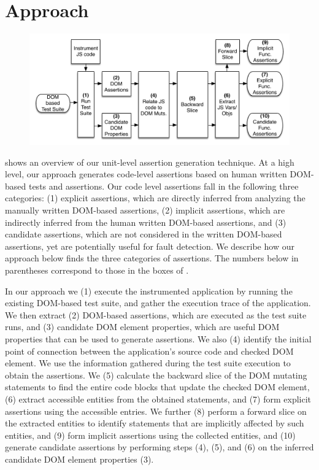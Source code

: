 \section{Approach} \label{Sec:approach}
\begin{figure}[!t]
  \centering
  \includegraphics[width=1\hsize]{fig/approachDiagram}
  \vspace{-0.3in} 
  \label{Fig:approachDiagram}
  \vspace{-0.2in} 
\end{figure}

 shows an overview of our unit-level assertion generation technique.
At a high level, our approach generates code-level assertions based on human written DOM-based tests and assertions. Our code level assertions fall in the following three categories: (1) explicit assertions, which are directly inferred from analyzing the manually written DOM-based assertions, (2) implicit assertions, which are indirectly inferred from the human written DOM-based assertions, and (3) candidate assertions, which are not considered in the written DOM-based assertions, yet are potentially useful for fault detection. We describe how our approach below finds the three categories of assertions. The numbers below in parentheses correspond to those in the boxes of .

In our approach we (1) execute the instrumented application by running the existing DOM-based test suite, and gather the execution trace of the application. We then extract (2) DOM-based assertions, which are executed as the test suite runs, and (3) candidate DOM element properties, which are useful DOM properties that can be used to generate assertions. We also (4) identify the initial point of connection between the application's source code and checked DOM element.
We use the information gathered during the test suite execution to obtain the assertions. We (5) calculate the backward slice of the DOM mutating statements to find the entire code blocks that update the checked DOM element, (6) extract accessible entities from the obtained statements, and (7) form explicit assertions using the accessible entries. 
We further (8) perform a forward slice on the extracted entities to identify statements that are implicitly affected by such entities, and (9) form implicit assertions using the collected entities, and (10) generate candidate assertions by performing steps (4), (5), and (6) on the inferred candidate DOM element properties (3).

